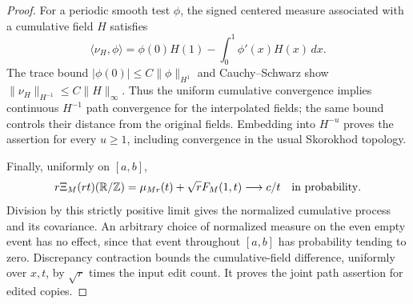 \documentclass[11pt,letterpaper]{article}
\newcommand{\T}{\mathbb R/\mathbb Z}\newcommand{\Leb}{\operatorname{Leb}}
\begin{document}
\begin{proof}
For a periodic smooth test $\phi$, the signed centered measure
associated with a cumulative field $H$ satisfies
\[
 \langle\nu_H,\phi\rangle
       =\phi(0)H(1)-\int_0^1\phi'(x)H(x)\,dx.
\]
The trace bound $|\phi(0)|\le C\|\phi\|_{H^1}$ and
Cauchy--Schwarz show
$\|\nu_H\|_{H^{-1}}\le C\|H\|_\infty$.
Thus the uniform cumulative convergence implies continuous
$H^{-1}$ path convergence for the interpolated fields; the
same bound controls their distance from the original fields.
Embedding into $H^{-u}$ proves the assertion for every $u\ge1$,
including convergence in the usual Skorokhod topology.

Finally, uniformly on $[a,b]$,
\[
 r\Xi_M(rt)(\T)=\mu_{Mr}(t)+\sqrt r F_M(1,t)
                         \longrightarrow c/t
                                      \quad\hbox{in probability}.
\]
Division by this strictly positive limit gives the normalized
cumulative process and its covariance. An arbitrary choice of
normalized measure on the even empty event has no effect,
since that event throughout $[a,b]$ has probability tending
to zero. Discrepancy contraction bounds the cumulative-field
difference, uniformly over $x,t$, by $\sqrt r$ times the input
edit count. It proves the joint path assertion for edited copies.
\end{proof}
\end{document}
